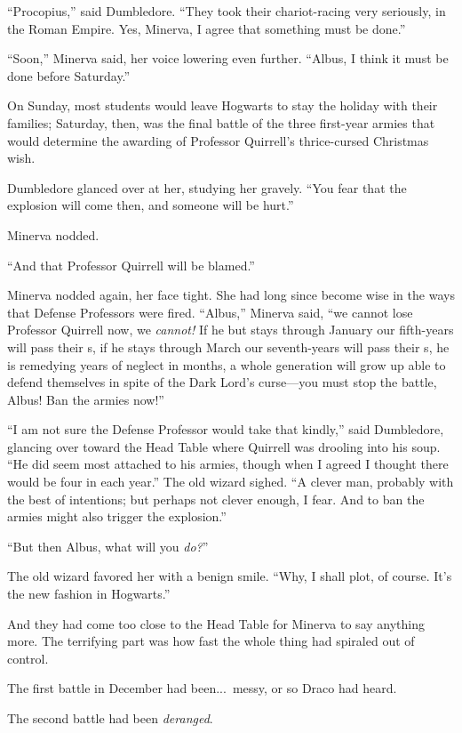 “Procopius,” said Dumbledore. “They took their chariot-racing very seriously, in the Roman Empire. Yes, Minerva, I agree that something must be done.”

“Soon,” Minerva said, her voice lowering even further. “Albus, I think it must be done before Saturday.”

On Sunday, most students would leave Hogwarts to stay the holiday with their families; Saturday, then, was the final battle of the three first-year armies that would determine the awarding of Professor Quirrell’s thrice-cursed Christmas wish.

Dumbledore glanced over at her, studying her gravely. “You fear that the explosion will come then, and someone will be hurt.”

Minerva nodded.

“And that Professor Quirrell will be blamed.”

Minerva nodded again, her face tight. She had long since become wise in the ways that Defense Professors were fired. “Albus,” Minerva said, “we cannot lose Professor Quirrell now, we \emph{cannot!} If he but stays through January our fifth-years will pass their s, if he stays through March our seventh-years will pass their s, he is remedying years of neglect in months, a whole generation will grow up able to defend themselves in spite of the Dark Lord’s curse—you must stop the battle, Albus! Ban the armies now!”

“I am not sure the Defense Professor would take that kindly,” said Dumbledore, glancing over toward the Head Table where Quirrell was drooling into his soup. “He did seem most attached to his armies, though when I agreed I thought there would be four in each year.” The old wizard sighed. “A clever man, probably with the best of intentions; but perhaps not clever enough, I fear. And to ban the armies might also trigger the explosion.”

“But then Albus, what will you \emph{do?}”

The old wizard favored her with a benign smile. “Why, I shall plot, of course. It’s the new fashion in Hogwarts.”

And they had come too close to the Head Table for Minerva to say anything more.
\sbreak
The terrifying part was how fast the whole thing had spiraled out of control.

The first battle in December had been...\ messy, or so Draco had heard.

The second battle had been \emph{deranged}.

